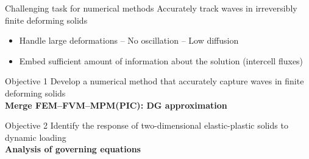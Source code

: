 \begin{withoutheadline}
  \begin{frame}{\text{  }}
    \begin{block}{Challenging task for numerical methods}
      \alert{Accurately track waves in irreversibly finite deforming solids}
      \begin{itemize}
      \item[1-] Handle large deformations -- No oscillation -- Low diffusion
      \item[2-] Embed sufficient amount of information about the solution (intercell fluxes)
      \end{itemize}
    \end{block}\pause 
    
    \begin{block}{Objective 1}
      Develop a numerical method that accurately capture waves in finite deforming solids \\
      \textbf{Merge FEM--FVM--MPM(PIC): DG approximation}
    \end{block}\pause
    \begin{block}{Objective 2}
      Identify the response of two-dimensional elastic-plastic solids to dynamic loading \\
      \textbf{Analysis of governing equations} %
    \end{block}
  \end{frame}
\end{withoutheadline}




